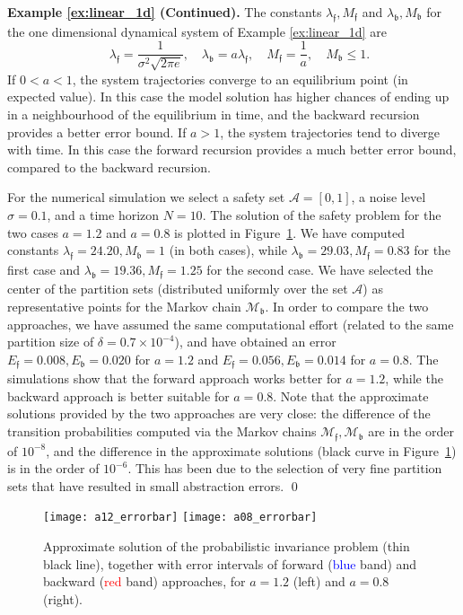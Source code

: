 \documentclass{LMCS}
\begin{document}
\medskip

\noindent\textbf{\textbf{Example \ref{ex:linear_1d} (Continued).}}
The constants $\lambda_{\mathfrak f},M_{\mathfrak f}$ and $\lambda_{\mathfrak b},M_{\mathfrak b}$ for the one dimensional dynamical system of Example \ref{ex:linear_1d} are
\begin{equation*}
\quad \lambda_{\mathfrak f} = \frac{1}{\sigma^2\sqrt{2\pi e}},\quad \lambda_{\mathfrak b} = a\lambda_{\mathfrak f}, \quad M_{\mathfrak f} =\frac{1}{a}, \quad M_{\mathfrak b}\le 1.
\end{equation*}
If $0<a<1$, 
the system trajectories converge to an equilibrium point (in expected value). 
In this case the model solution has higher chances of ending up in a neighbourhood of the equilibrium in time, 
and the backward recursion provides a better error bound. 
If $a>1$, 
the system trajectories tend to diverge with time. 
In this case the forward recursion provides a much better error bound, 
compared to the backward recursion. 

For the numerical simulation we select a safety set $\mathcal A = [0,1]$, 
a noise level $\sigma = 0.1$, 
and a time horizon $N = 10$. 
The solution of the safety problem for the two cases $a = 1.2$ and $a=0.8$ is plotted in Figure~\ref{fig:1d_example}.
We have computed constants $\lambda_{\mathfrak f} = 24.20, M_{\mathfrak b} = 1$ (in both cases), 
while $\lambda_{\mathfrak b} = 29.03, M_{\mathfrak f} = 0.83$ for the first case  
and $\lambda_{\mathfrak b} = 19.36, M_{\mathfrak f} = 1.25$ for the second case. 
We have selected the center of the partition sets (distributed uniformly over the set $\mathcal A$) as representative points for the Markov chain $\mathscr M_{\mathfrak b}$.
In order to compare the two approaches, we have assumed the same computational effort (related to the same partition size of $\delta = 0.7\times 10^{-4}$),
and have obtained an error $E_{\mathfrak f} = 0.008,E_{\mathfrak b} = 0.020$ for $a=1.2$ and $E_{\mathfrak f} = 0.056, E_{\mathfrak b} = 0.014$ for $a=0.8$.
The simulations show that the forward approach works better for $a=1.2$, 
while the backward approach is better suitable for $a=0.8$.
Note that the approximate solutions provided by the two approaches are very close: 
the difference of the transition probabilities computed via the Markov chains $\mathcal M_{\mathfrak f},\mathcal M_{\mathfrak b}$ are in the order of $10^{-8}$, 
and the difference in the approximate solutions (black curve in Figure~\ref{fig:1d_example}) is in the order of $10^{-6}$. 
This has been due to the selection of very fine partition sets that have resulted in small abstraction errors. \hfill\qed
\begin{figure}
\centering
\texttt{[image: a12\_errorbar]}
\texttt{[image: a08\_errorbar]}
\caption{Approximate solution of the probabilistic invariance problem (thin black line), 
together with error intervals of forward (\textcolor{blue}{blue} band) and backward (\textcolor{red}{red} band) approaches, for $a=1.2$ (left) and $a=0.8$ (right).}
\label{fig:1d_example}
\end{figure}
\end{document}
